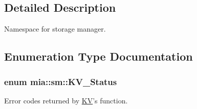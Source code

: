 \subsection{Detailed Description}
Namespace for storage manager. 

\subsection{Enumeration Type Documentation}
\hypertarget{namespacemia_1_1sm_a401cbf14ccf01146eb01e3a19aa5a0dc}{
\subsubsection[{K\-V\-\_\-\-Status}]{\setlength{\rightskip}{0pt plus 5cm}enum {\bf mia\-::sm\-::\-K\-V\-\_\-\-Status}}}\label{namespacemia_1_1sm_a401cbf14ccf01146eb01e3a19aa5a0dc}
Error codes returned by \hyperlink{classmia_1_1sm_1_1_k_v}{K\-V}'s function. 
